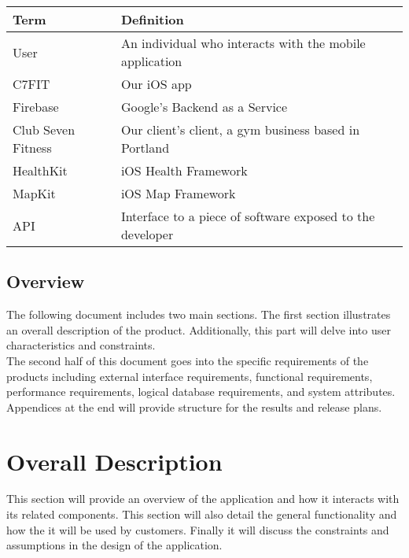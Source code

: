 \documentclass[letterpaper,10pt,titlepage]{article}
\begin{document}
\begin{center}
    \begin{tabular}{ | l | l | p{5cm} |}
    \hline
Term               & Definition                                               \\ \hline
User               & An individual who interacts with the mobile application \\ \hline
C7FIT              & Our iOS app                                              \\ \hline
Firebase           & Google's Backend as a Service                                  \\ \hline
Club Seven Fitness & Our client's client, a gym business based in Portland    \\ \hline
HealthKit          & iOS Health Framework                                     \\ \hline
MapKit             & iOS Map Framework                                        \\ \hline
API                & Interface to a piece of software exposed to the developer \\ \hline
    \end{tabular}
\end{center}

\subsection{Overview}

The following document includes two main sections. The first section illustrates an overall description of the product. Additionally, this part will delve into user characteristics and constraints.\\

The second half of this document goes into the specific requirements of the products including external interface requirements, functional requirements, performance requirements, logical database requirements, and system attributes. Appendices at the end will provide structure for the results and release plans.\\

\section{Overall Description}

This section will provide an overview of the application and how it interacts with its related components. This section will also detail the general functionality and how the it will be used by customers. Finally it will discuss the constraints and assumptions in the design of the application.
\end{document}
